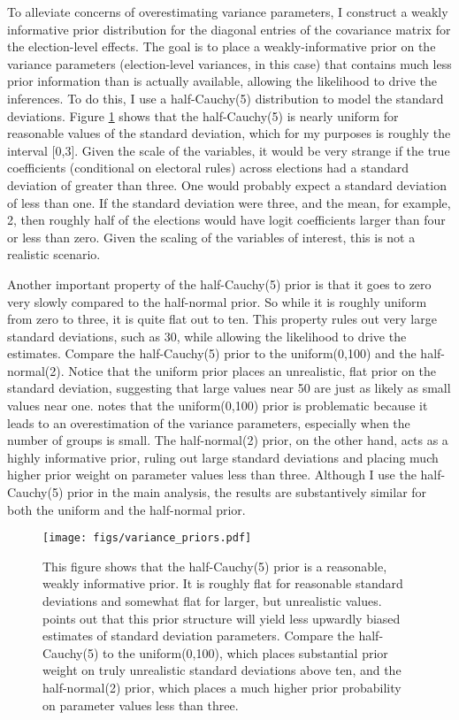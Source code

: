 \documentclass[12pt]{article}
\begin{document}
\begin{appendix}
To alleviate concerns of overestimating variance parameters, I construct a weakly informative prior distribution for the diagonal entries of the covariance matrix for the election-level effects. The goal is to place a weakly-informative prior on the variance parameters (election-level variances, in this case) that contains much less prior information than is actually available, allowing the likelihood to drive the inferences. To do this, I use a half-Cauchy(5) distribution to model the standard deviations. Figure \ref{priors} shows that the half-Cauchy(5) is nearly uniform for reasonable values of the standard deviation, which for my purposes is roughly the interval [0,3]. Given the scale of the variables, it would be very strange if the true coefficients (conditional on electoral rules) across elections had a standard deviation of greater than three. One would probably expect a standard deviation of less than one. If the standard deviation were three, and the mean, for example, 2, then roughly half of the elections would have logit coefficients larger than four or less than zero. Given the scaling of the variables of interest, this is not a realistic scenario.

Another important property of the half-Cauchy(5) prior is that it goes to zero very slowly compared to the half-normal prior. So while it is roughly uniform from zero to three, it is quite flat out to ten. This property rules out very large standard deviations, such as 30, while allowing the likelihood to drive the estimates. Compare the half-Cauchy(5) prior to the uniform(0,100) and the half-normal(2). Notice that the uniform prior places an unrealistic, flat prior on the standard deviation, suggesting that large values near 50 are just as likely as small values near one. \cite{Gelman2006a} notes that the uniform(0,100) prior is problematic because it leads to an overestimation of the variance parameters, especially when the number of groups is small. The half-normal(2) prior, on the other hand, acts as a highly informative prior, ruling out large standard deviations and placing much higher prior weight on parameter values less than three. Although I use the half-Cauchy(5) prior in the main analysis, the results are substantively similar for both the uniform and the half-normal prior. 

\begin{figure}[h!]
\centering
\texttt{[image: figs/variance\_priors.pdf]}
\caption{This figure shows that the half-Cauchy(5) prior is a reasonable, weakly informative prior. It is roughly flat for reasonable standard deviations and somewhat flat for larger, but unrealistic values. \cite{Gelman2006a} points out that this prior structure will yield less upwardly biased estimates of standard deviation parameters. Compare the half-Cauchy(5) to the uniform(0,100), which places substantial prior weight on truly unrealistic standard deviations above ten, and the half-normal(2) prior, which places a much higher prior probability on parameter values less than three.}\label{priors}
\end{figure}


\end{appendix}
\end{document}
